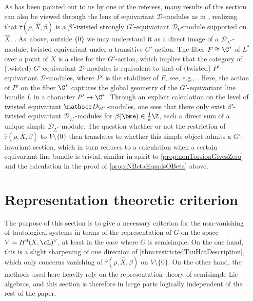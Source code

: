 \begin{rmk}\label{rmk:RemarkToReferee}
As has been pointed out to us by one of the referees, many results of this section can also be viewed through the lens of equivariant $\mathscr D$\nobreakdash-mod\-ules as in \cite{BeilinsonBernstein_Jantzen}, realizing that $\hat \tau(\rho, \hat X, \beta)$ is a $\beta'$-twisted strongly $G'$-equivariant $\mathscr D_V$\nobreakdash-mod\-ule supported on $\hat X$, \cite[Def.\,p.\,16]{Hot98}. As~above, outside $\{0\}$ we may understand it as a direct image of a $\mathscr D_{L^*}$\nobreakdash-mod\-ule, twisted equivariant under a transitive $G'$-action. The fiber $F \cong \C^*$ of $L^*$ over a point of $X$ is a slice for the $G'$-action, which implies that the category of (twisted) $G'$-equivariant $\mathscr D$\nobreakdash-mod\-ules is equivalent to that of (twisted) $P'$-equivariant $\mathscr D$\nobreakdash-mod\-ules, where $P'$ is the stabilizer of $F$, see, e.g., \cite[Prop.\,4.5]{Lorincz-Walther}. Here, the action of $P'$ on the fiber $\C^*$ captures the global geometry of the $G'$-equivariant line bundle $L$ in a character $P' \to \C^*$. Through an explicit calculation on the level of twisted equivariant $\mathscr D_{\C^*}$\nobreakdash-mod\-ules, one sees that there only exist $\beta'$-twisted equivariant $\mathscr D_{L^*}$\nobreakdash-mod\-ules for $\beta(\bme)\in \frac{1}{k} \Z$, each a direct sum of a unique simple $\mathscr D_{L^*}$\nobreakdash-mod\-ule. The question whether or not the restriction of $\hat \tau(\rho, \overline X, \beta)$ to $V \setminus \{0\}$ then translates to whether this simple object admits a $G'$-invariant section, which in turn reduces to a calculation when a certain equivariant line bundle is trivial, similar in spirit to \cref{prop:nonTorsionGivesZero} and the calculation in the proof of \cref{prop:NBetaEqualsOBeta} above.
\end{rmk}

\section{Representation theoretic criterion}\label{sec:FormuleBeta}

The purpose of this section is to give a necessary criterion for the non-vanishing of tautological systems in terms of the representation of $G$ on the space $V=H^0(X,\cL)^\vee$, at least in the case where $G$ is semisimple. On the one hand, this is a slight sharpening of one direction of \cref{thm:restrictedTauHatDescription}, which only concerns vanishing of $\hat{\tau}(\rho,\hat{X},\beta)$ on $V\setminus\{0\}$. On the other hand, the methods used
here heavily rely on the representation theory of semisimple Lie algebras, and this section is therefore in large parts logically independent of the rest of the paper.

